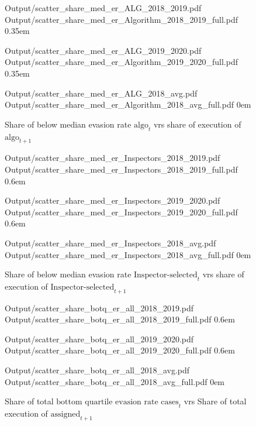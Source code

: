 \documentclass{article}
\newcommand{\OutPath}{Output/}%
\newcommand{\OutPath}{../Output/}%
\begin{document}
\begin{figure}[H]
    \centering
    \caption{Share of below median evasion rate $\text{algo}_t$ vrs share of execution of $\text{algo}_{t+1}$}

      {\OutPath scatter_share_med_er_ALG_2018_2019.pdf}
      {\OutPath scatter_share_med_er_Algorithm_2018_2019_full.pdf}
      {0.35em}

      {\OutPath scatter_share_med_er_ALG_2019_2020.pdf}
      {\OutPath scatter_share_med_er_Algorithm_2019_2020_full.pdf}
      {0.35em}

      {\OutPath scatter_share_med_er_ALG_2018_avg.pdf}
      {\OutPath scatter_share_med_er_Algorithm_2018_avg_full.pdf}
      {0em}
\end{figure}

\begin{figure}[H]
    \centering
    \caption{Share of below median evasion rate $\text{Inspector-selected}_t$ vrs share of execution of $\text{Inspector-selected}_{t+1}$}

      {\OutPath scatter_share_med_er_Inspectors_2018_2019.pdf}
      {\OutPath scatter_share_med_er_Inspectors_2018_2019_full.pdf}
      {0.6em}

      {\OutPath scatter_share_med_er_Inspectors_2019_2020.pdf}
      {\OutPath scatter_share_med_er_Inspectors_2019_2020_full.pdf}
      {0.6em}

      {\OutPath scatter_share_med_er_Inspectors_2018_avg.pdf}
      {\OutPath scatter_share_med_er_Inspectors_2018_avg_full.pdf}
      {0em}
\end{figure}


\begin{figure}[H]
    \centering
    \caption{Share of total $\text{bottom quartile evasion rate cases}_t$ vrs Share of total execution of $\text{assigned}_{t+1}$}

      {\OutPath scatter_share_botq_er_all_2018_2019.pdf}
      {\OutPath scatter_share_botq_er_all_2018_2019_full.pdf}
      {0.6em}

      {\OutPath scatter_share_botq_er_all_2019_2020.pdf}
      {\OutPath scatter_share_botq_er_all_2019_2020_full.pdf}
      {0.6em}

      {\OutPath scatter_share_botq_er_all_2018_avg.pdf}
      {\OutPath scatter_share_botq_er_all_2018_avg_full.pdf}
      {0em}
\end{figure}
\end{document}
